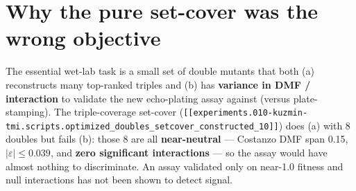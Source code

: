 \section{Why the pure set-cover was the wrong objective}

The essential wet-lab task is a small set of double mutants that both (a) reconstructs many
top-ranked triples and (b) has \textbf{variance in DMF / interaction} to validate the new
echo-plating assay against (versus plate-stamping). The triple-coverage set-cover
(\texttt{[[experiments.010-kuzmin-tmi.scripts.optimized\_doubles\_setcover\_constructed\_10]]})
does (a) with 8 doubles but fails (b): those 8 are all \textbf{near-neutral} --- Costanzo DMF
span 0.15, $|\varepsilon| \le 0.039$, and \textbf{zero significant interactions} --- so the
assay would have almost nothing to discriminate. An assay validated only on near-1.0 fitness
and null interactions has not been shown to detect signal.
